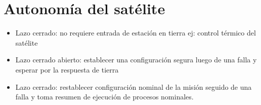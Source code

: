 \documentclass[12pt]{extarticle}
\begin{document}
\section{Autonomía del satélite}
\begin{itemize}
    \item Lazo cerrado: no requiere entrada de estación en tierra ej: control térmico del satélite
    \item Lazo cerrado abierto: establecer una configuración segura luego de una falla y esperar por la respuesta de tierra
    \item  Lazo cerrado: restablecer configuración nominal de la misión seguido de una falla y toma resumen de ejecución de procesos nominales.
\end{itemize}




\nocite{GOCI}
\nocite{MOCI}
\nocite{EAU}
 
 
 
 


\end{document}
